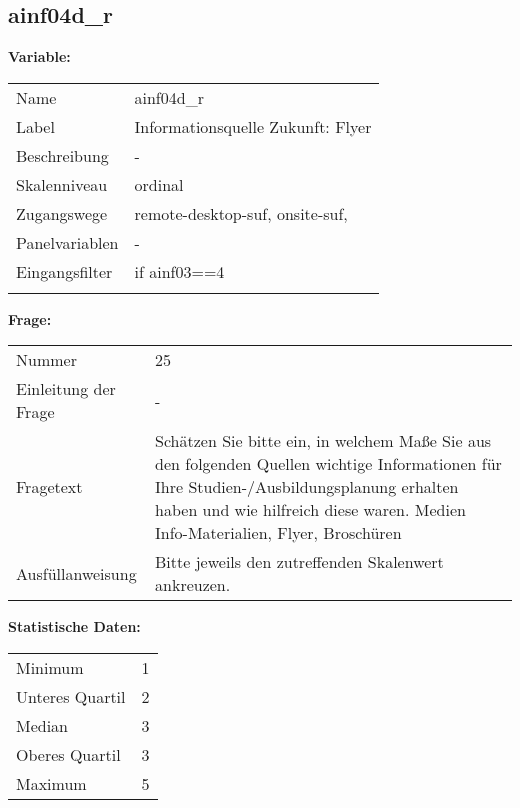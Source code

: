	
	
	\subsection{ainf04d\_r}
	\label{subSection:ainf04d_r}

	\noindent\textbf{Variable:}\\
		\begin{tabular}{lL{11.3cm}}
			\label{tableVariable:ainf04d_r}
			Name & ainf04d\_r \\
			Label & Informationsquelle Zukunft: Flyer \\
			Beschreibung & - \\
			Skalenniveau & ordinal \\
			Zugangswege &
				remote-desktop-suf,
				onsite-suf,
 \\
			Panelvariablen & -
			 \\
			Eingangsfilter & if ainf03==4 \\
 \\
		\end{tabular}

		\vspace*{1 cm}
		\noindent\textbf{Frage:}\\
		\begin{tabular}{lL{11.3cm}}
			\label{tableQuestion:ainf04d_r}
			Nummer & 25 \\
			Einleitung der Frage & - \\
			Fragetext & Schätzen Sie bitte ein, in welchem Maße Sie aus den folgenden Quellen wichtige Informationen für Ihre Studien-/Ausbildungsplanung erhalten haben und wie hilfreich diese waren.
Medien
Info-Materialien, Flyer, Broschüren \\
			Ausfüllanweisung & Bitte jeweils den zutreffenden Skalenwert ankreuzen. \\
		\end{tabular}


		\vspace*{1 cm}
		\noindent\textbf{Statistische Daten:}\\
			\begin{tabular}{ll}
				\label{tableStatistics:ainf04d_r}
					Minimum & 1 \\
					Unteres Quartil & 2 \\
					Median & 3 \\
					Oberes Quartil & 3 \\
					Maximum & 5 \\
			\end{tabular}



